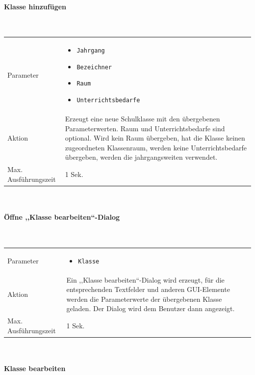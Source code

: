 \documentclass[fontsize=12pt,paper=a4,twoside]{scrartcl}
\begin{document}
\paragraph{Klasse hinzufügen}\mbox{}\\

\begin{tabularx}{\textwidth}{p{4cm}X}
Parameter & \begin{itemize}[itemsep=0pt, leftmargin = 0.5cm]
			\item \texttt{Jahrgang}
			\item \texttt{Bezeichner}
			\item \texttt{Raum}
			\item \texttt{Unterrichtsbedarfe}
			\end{itemize}\\
Aktion & Erzeugt eine neue Schulklasse mit den übergebenen Parameterwerten. Raum und Unterrichtsbedarfe sind optional. Wird kein Raum übergeben, hat die Klasse keinen zugeordneten Klassenraum, werden keine Unterrichtsbedarfe übergeben, werden die jahrgangsweiten verwendet.\\
Max. Ausführungszeit & 1 Sek. 
\end{tabularx}\\


\paragraph{Öffne ,,Klasse bearbeiten``-Dialog}\mbox{}\\

\begin{tabularx}{\textwidth}{p{4cm}X}
Parameter & \begin{itemize}[itemsep=0pt, leftmargin = 0.5cm]
			\item \texttt{Klasse}
			\end{itemize}\\
Aktion & Ein ,,Klasse bearbeiten``-Dialog wird erzeugt, für die entsprechenden Textfelder und anderen GUI-Elemente werden die Parameterwerte der übergebenen Klasse geladen. Der Dialog wird dem Benutzer dann angezeigt.\\
Max. Ausführungszeit & 1 Sek. 
\end{tabularx}\\


\paragraph{Klasse bearbeiten}\mbox{}\\
\end{document}
